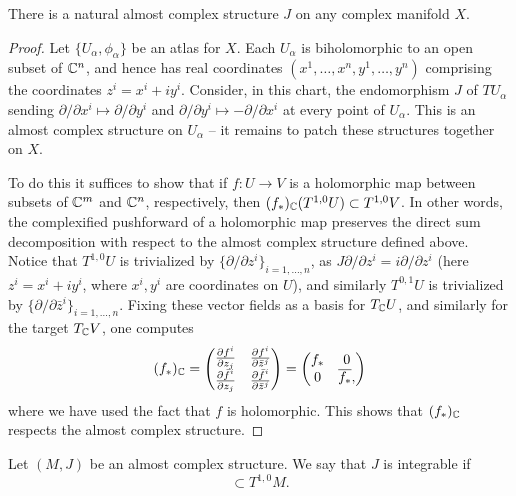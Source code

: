 \documentclass{amsart}
\begin{document}
\begin{proposition}
    There is a natural almost complex structure $J$ on any complex manifold $X$.
\end{proposition}
\begin{proof}
    Let $\{U_\alpha,\phi_\alpha\}$ be an atlas for $X$. Each $U_\alpha$ is biholomorphic to an
    open subset of $\mathbb{C}^n$, and hence has real coordinates $(x^1,\ldots,x^n,y^1,\ldots,y^n)$ comprising
    the coordinates $z^i=x^i+iy^i$. Consider, in this chart, the endomorphism $J$ of $TU_\alpha$ sending
    $\partial/\partial x^i\mapsto \partial/\partial y^i$ and $\partial/\partial y^i\mapsto -\partial/\partial x^i$
    at every point of $U_\alpha$. This is an almost complex structure on $U_\alpha$ -- it remains to
    patch these structures together on $X$.

    To do this it suffices to show that if $f:U\to V$ is a holomorphic map between subsets of $\mathbb{C}^m$ and $\mathbb{C}^n$, respectively,
    then $(f_*)_{\mathbb{C}}(T^{1,0}U)\subset T^{1,0}V$.
    In other words, the complexified pushforward of a holomorphic map preserves the direct sum decomposition with
    respect to the almost complex structure defined above.
    Notice that $T^{1,0}U$ is trivialized by $\{\partial/\partial z^i\}_{i=1,\ldots,n}$,
    as $J\partial/\partial z^i=i\partial/\partial z^i$ (here $z^i=x^i+iy^i$, where $x^i,y^i$ are coordinates on $U$),
    and similarly $T^{0,1}U$ is trivialized by $\{\partial/\partial \bar z^i\}_{i=1,\ldots,n}$. Fixing these vector fields
    as a basis for $T_{\mathbb{C}} U$, and similarly for the target $T_{\mathbb{C}} V$, one computes
    \begin{equation*}
        (f_*)_{\mathbb{C}} =
        \begin{pmatrix}
            \frac{\partial f^i}{\partial z_j} & \frac{\partial f^i}{\partial \bar z^j}\\
            \frac{\partial \bar f^i}{\partial z_j} & \frac{\partial \bar f^i}{\partial \bar z^j}
        \end{pmatrix}
        =
        \begin{pmatrix}
            f_* & 0\\
            0 & \overline{f_*},
        \end{pmatrix}
    \end{equation*}
    where we have used the fact that $f$ is holomorphic. This shows that $(f_*)_{\mathbb{C}}$ respects the almost complex structure.
\end{proof}

\begin{definition}
    Let $(M,J)$ be an almost complex structure. We say that $J$ is {\color{blue}integrable} if
    \begin{equation*}
        [T^{1,0}M, T^{1,0}M] \subset T^{1,0}M.
    \end{equation*}
\end{definition}
\end{document}
